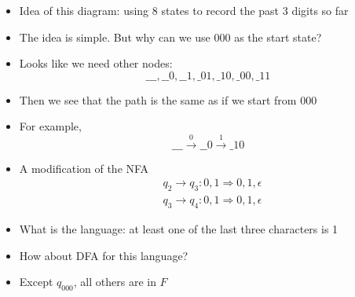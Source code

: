 \begin{frame}[allowframebreaks]
\begin{tikzpicture}
\end{tikzpicture}

\begin{itemize}
\item 
Idea of this diagram: using 8 states
to record the past 3 digits so far

\item The idea is simple. But 
why can we use 000 as the start state? 
\item Looks like we need other nodes:
  \begin{equation*}
    \_\_\_,
    \_\_0,
    \_\_1,
    \_01,
    \_10,
    \_00,
    \_11 
\end{equation*}
\item Then we see that the path is the same as if
  we start from  000
\item For example,
  \begin{equation*}
    \_\_\_ \xrightarrow{0}
    \_\_0 \xrightarrow{1}
    \_10
  \end{equation*}

\item A modification of the NFA 
  \begin{equation*}
    \begin{split}
& q_2 \rightarrow q_3:0,1 \Rightarrow 0,1,\epsilon\\
& q_3 \rightarrow q_4:0,1 \Rightarrow 0,1,\epsilon
\end{split}
\end{equation*}
\framebreak
\begin{center}
    \end{center}

  \item What is the language: at least one of the last three characters
    is 1
\item How about DFA for this language?

\item [] Except $q_{000}$, all others are in $F$
\end{itemize}\end{frame}


